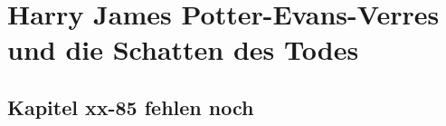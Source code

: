 \part{Harry James Potter-Evans-Verres und die Schatten des Todes}














% 
% 
% 
% 
% 
% 
% 
% 
% 
% 
% 
% 
% 
% 
% 
% 
% 
% 
% 
% 
% 
% 
% 
% 
% 
% 
% 
% 
% 
% 
% 
% 
% 
% 
\chapter*{Kapitel xx-85 fehlen noch}
